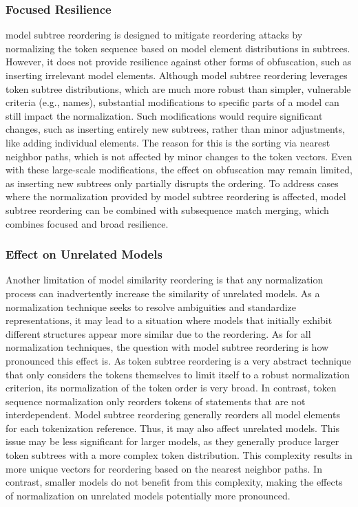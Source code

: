     \subsubsection{Focused Resilience} model subtree reordering is designed to mitigate reordering attacks by normalizing the token sequence based on model element distributions in subtrees. However, it does not provide resilience against other forms of obfuscation, such as inserting irrelevant model elements. %
    Although model subtree reordering leverages token subtree distributions, which are much more robust than simpler, vulnerable criteria (e.g., names), substantial modifications to specific parts of a model can still impact the normalization. Such modifications would require significant changes, such as inserting entirely new subtrees, rather than minor adjustments, like adding individual elements. The reason for this is the sorting via nearest neighbor paths, which is not affected by minor changes to the token vectors.
    Even with these large-scale modifications, the effect on obfuscation may remain limited, as inserting new subtrees only partially disrupts the ordering.
    To address cases where the normalization provided by model subtree reordering is affected, model subtree reordering can be combined with subsequence match merging, which combines focused and broad resilience.

    \subsubsection{Effect on Unrelated Models}
    Another limitation of model similarity reordering is that any normalization process can inadvertently increase the similarity of unrelated models. As a normalization technique seeks to resolve ambiguities and standardize representations, it may lead to a situation where models that initially exhibit different structures appear more similar due to the reordering.
    As for all normalization techniques, the question with model subtree reordering is how pronounced this effect is.
    As token subtree reordering is a very abstract technique that only considers the tokens themselves to limit itself to a robust normalization criterion, its normalization of the token order is very broad. In contrast, token sequence normalization only reorders tokens of statements that are not interdependent. Model subtree reordering generally reorders all model elements for each tokenization reference. Thus, it may also affect unrelated models.
    This issue may be less significant for larger models, as they generally produce larger token subtrees with a more complex token distribution. This complexity results in more unique vectors for reordering based on the nearest neighbor paths. In contrast, smaller models do not benefit from this complexity, making the effects of normalization on unrelated models potentially more pronounced.
  